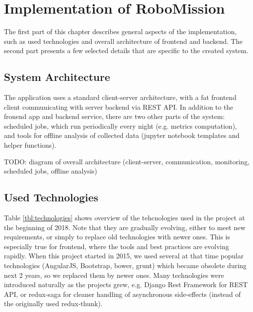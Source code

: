 \chapter{Implementation of RoboMission}
\label{chap:implementation-of-robomission}

The first part of this chapter describes general aspects of the implementation,
such as used technologies and overall architecture of frontend and backend.
The second part presents a few selected details that are specific to the created system.

\section{System Architecture}

The application uses a standard client-server architecture,
with a fat frontend client communicating with server backend via REST API.
In addition to the fronend app and backend service,
there are two other parts of the system:
scheduled jobs, which run periodically every night (e.g. metrics computation),
and tools for offline analysis of collected data
(jupyter notebook templates and helper functions).  %


TODO: diagram of overall architecture (client-server, communication, monitoring, scheduled jobs, offline analysis)

\section{Used Technologies}

Table \ref{tbl:technologies} shows overview of the tehcnologies used
in the project at the beginning of 2018.
Note that they are gradually evolving, either to meet new requirements,
or simply to replace old technologies with newer ones.
This is especially true for frontend, where the tools and best practices
are evolving rapidly.
When this project started in 2015,
we used several at that time popular technologies
(AngularJS, Bootstrap, bower, grunt)
which became obsolete during next 2 years,
so we replaced them by newer ones.
Many technologies were introduced naturally as the projects grew,
e.g. Django Rest Framework for REST API,
or redux-saga for cleaner handling of asynchronous side-effects
(instead of the originally used redux-thunk).


